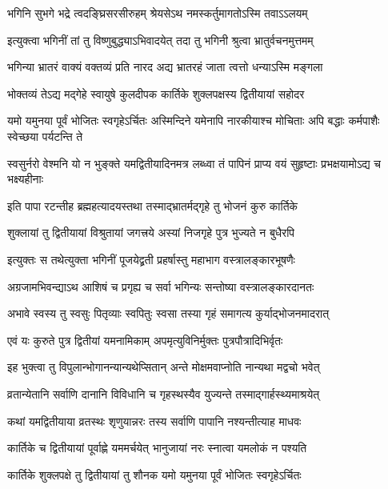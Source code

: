 \twolineshloka
{भगिनि सुभगे भद्रे त्वदङ्घ्रिसरसीरुहम्}
{श्रेयसेऽथ नमस्कर्तुमागतोऽस्मि तवाऽऽलयम्} %

\twolineshloka
{इत्युक्त्वा भगिनीं तां तु विष्णुबुद्ध्याऽभिवादयेत्}
{तदा तु भगिनी श्रुत्वा भ्रातुर्वचनमुत्तमम्} %

\twolineshloka
{भगिन्या भ्रातरं वाक्यं वक्तव्यं प्रति नारद}
{अद्य भ्रातरहं जाता त्वत्तो धन्याऽस्मि मङ्गला} %

\twolineshloka
{भोक्तव्यं तेऽद्य मद्गेहे स्वायुषे कुलदीपक}
{कार्तिके शुक्लपक्षस्य द्वितीयायां सहोदर} %

\threelineshloka
{यमो यमुनया पूर्वं भोजितः स्वगृहेऽर्चितः}
{अस्मिन्दिने यमेनापि नारकीयाश्च मोचिताः}
{अपि बद्धाः कर्मपाशैः स्वेच्छया पर्यटन्ति ते} %

\fourlineindentedshloka
{स्वसुर्नरो वेश्मनि यो न भुङ्क्ते}
{यमद्वितीयादिनमत्र लब्ध्वा}
{तं पापिनं प्राप्य वयं सुहृष्टाः}
{प्रभक्षयामोऽद्य च भक्ष्यहीनाः} %

\twolineshloka
{इति पापा रटन्तीह ब्रह्महत्यादयस्तथा}
{तस्माद्भ्रातर्मद्गृहे तु भोजनं कुरु कार्तिके} %

\twolineshloka
{शुक्लायां तु द्वितीयायां विश्रुतायां जगत्त्रये}
{अस्यां निजगृहे पुत्र भुज्यते न बुधैरपि} %

\twolineshloka
{इत्युक्तः स तथेत्युक्ता भगिनीं पूजयेद्व्रती}
{प्रहर्षास्तु महाभाग वस्त्रालङ्कारभूषणैः} %

\twolineshloka
{अग्रजामभिवन्द्याऽथ आशिषं च प्रगृह्य च}
{सर्वा भगिन्यः सन्तोष्या वस्त्रालङ्कारदानतः} %

\twolineshloka
{अभावे स्वस्य तु स्वसुः पितृव्याः स्वपितुः स्वसा}
{तस्या गृहं समागत्य कुर्याद्भोजनमादरात्} %

\twolineshloka
{एवं यः कुरुते पुत्र द्वितीयां यमनामिकाम्}
{अपमृत्युविनिर्मुक्तः पुत्रपौत्रादिभिर्वृतः} %

\twolineshloka
{इह भुक्त्वा तु विपुलान्भोगानन्यान्यथेप्सितान्}
{अन्ते मोक्षमवाप्नोति नान्यथा मद्वचो भवेत्} %

\twolineshloka
{व्रतान्येतानि सर्वाणि दानानि विविधानि च}
{गृहस्थस्यैव युज्यन्ते तस्माद्गार्हस्थ्यमाश्रयेत्} %

\twolineshloka
{कथां यमद्वितीयाया व्रतस्थः शृणुयान्नरः}
{तस्य सर्वाणि पापानि नश्यन्तीत्याह माधवः} %


\twolineshloka
{कार्तिके च द्वितीयायां पूर्वाह्णे यममर्चयेत्}
{भानुजायां नरः स्नात्वा यमलोकं न पश्यति} %

\twolineshloka
{कार्तिके शुक्लपक्षे तु द्वितीयायां तु शौनक}
{यमो यमुनया पूर्वं भोजितः स्वगृहेऽर्चितः} %

